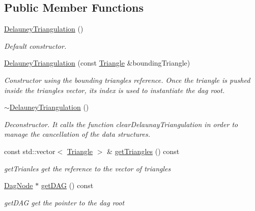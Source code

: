 \subsection*{Public Member Functions}
\begin{DoxyCompactItemize}
\item 
\mbox{\label{classDelauneyTriangulation_a570d9e4ccc005901f389cc06c1861706}} 
\hyperlink{classDelauneyTriangulation_a570d9e4ccc005901f389cc06c1861706}{Delauney\+Triangulation} ()
\begin{DoxyCompactList}\small\item\em Default constructor. \end{DoxyCompactList}\item 
\hyperlink{classDelauneyTriangulation_a25cb3fddd10968f7d4dcbdf25064b0aa}{Delauney\+Triangulation} (const \hyperlink{classTriangle}{Triangle} \&bounding\+Triangle)
\begin{DoxyCompactList}\small\item\em Constructor using the bounding triangle\textquotesingle{}s reference. Once the triangle is pushed inside the triangles vector, its index is used to instantiate the dag root. \end{DoxyCompactList}\item 
\mbox{\label{classDelauneyTriangulation_ab0d0ce2572f73b9c13fc8bb48d8ab321}} 
\hyperlink{classDelauneyTriangulation_ab0d0ce2572f73b9c13fc8bb48d8ab321}{$\sim$\+Delauney\+Triangulation} ()
\begin{DoxyCompactList}\small\item\em Deconstructor. It calls the function clear\+Delaunay\+Triangulation in order to manage the cancellation of the data structures. \end{DoxyCompactList}\item 
const std\+::vector$<$ \hyperlink{classTriangle}{Triangle} $>$ \& \hyperlink{classDelauneyTriangulation_af24d65605edf45cf31ad26243ba32bdf}{get\+Triangles} () const
\begin{DoxyCompactList}\small\item\em get\+Trianles get the reference to the vector of triangles \end{DoxyCompactList}\item 
\hyperlink{classDagNode}{Dag\+Node} $\ast$ \hyperlink{classDelauneyTriangulation_a4d9be06e34b8e48dc4f2eceb719094fd}{get\+D\+AG} () const
\begin{DoxyCompactList}\small\item\em get\+D\+AG get the pointer to the dag root \end{DoxyCompactList}\item 

\end{DoxyCompactItemize}

